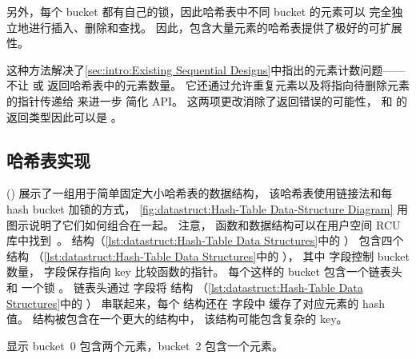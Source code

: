 \QuickQuizEnd

另外，每个 bucket 都有自己的锁，因此哈希表中不同 bucket 的元素可以
完全独立地进行插入、删除和查找。
因此，包含大量元素的哈希表提供了极好的可扩展性。

这种方法解决了\cref{sec:intro:Existing Sequential Designs}中指出的元素计数问题——
不让  或  返回哈希表中的元素数量。
它还通过允许重复元素以及将指向待删除元素的指针传递给  来进一步
简化 API。
这两项更改消除了返回错误的可能性，
 和  的返回类型因此可以是 。

\subsection{哈希表实现}
\label{sec:datastruct:Hash-Table Implementation}

\begin{fcvref}
()
展示了一组用于简单固定大小哈希表的数据结构，
该哈希表使用链接法和每 hash bucket 加锁的方式，
\cref{fig:datastruct:Hash-Table Data-Structure Diagram}
用图示说明了它们如何组合在一起。
注意， 函数和数据结构可以在用户空间 RCU
库中找到~\cite{MathieuDesnoyers2009URCU,PaulMcKenney2013LWNURCUqueuestack,PaulMcKenney2013LWNURCUqueuestackAPI,PaulMcKenney2013LWNURCUlist}。
 结构（\cref{lst:datastruct:Hash-Table Data Structures}中的
）
包含四个  结构
（\cref{lst:datastruct:Hash-Table Data Structures}中的
），
其中  字段控制 bucket 数量，
 字段保存指向 key 比较函数的指针。
每个这样的 bucket 包含一个链表头  和
一个锁 。
链表头通过  字段将  结构
（\cref{lst:datastruct:Hash-Table Data Structures}中的
）
串联起来，每个  结构还在  字段中
缓存了对应元素的 hash 值。
 结构被包含在一个更大的结构中，
该结构可能包含复杂的 key。
\end{fcvref}
显示 bucket~0 包含两个元素，bucket~2 包含一个元素。

